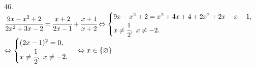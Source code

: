 46. $\cfrac{9x-x^2+2}{2x^2+3x-2}=\cfrac{x+2}{2x-1}+\cfrac{x+1}{x+2}\Leftrightarrow\begin{cases} 9x-x^2+2=x^2+4x+4+2x^2+2x-x-1,\\ x\neq\cfrac{1}{2},\ x\neq-2.\end{cases}$\\$\Leftrightarrow\begin{cases} (2x-1)^2=0,\\ x\neq\cfrac{1}{2},\ x\neq-2.\end{cases}\Leftrightarrow x\in\{\varnothing\}.$\\
